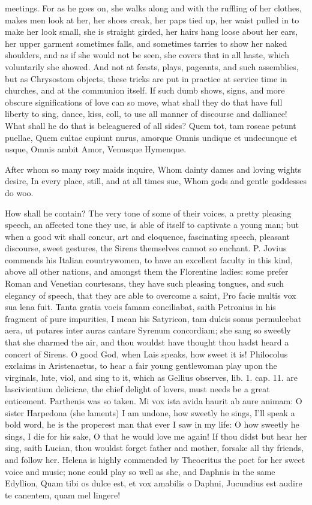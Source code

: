 {meetings. For as he goes on, she walks along and with the
ruffling of her clothes, makes men look at her, her shoes creak, her
paps tied up, her waist pulled in to make her look small, she is
straight girded, her hairs hang loose about her ears, her upper garment
sometimes falls, and sometimes tarries to show her naked shoulders, and
as if she would not be seen, she covers that in all haste, which
voluntarily she showed. And not at feasts, plays, pageants, and such
assemblies, but as Chrysostom objects, these tricks are put in
practice at service time in churches, and at the communion itself. If
such dumb shows, signs, and more obscure significations of love can so
move, what shall they do that have full liberty to sing, dance, kiss,
coll, to use all manner of discourse and dalliance! What shall he do
that is beleaguered of all sides?
Quem tot, tam roseae petunt puellae,
Quem cultae cupiunt nurus, amorque
Omnis undique et undecunque et usque,
Omnis ambit Amor, Venusque Hymenque.

After whom so many rosy maids inquire,
Whom dainty dames and loving wights desire,
In every place, still, and at all times sue,
Whom gods and gentle goddesses do woo.

How shall he contain? The very tone of some of their voices, a pretty
pleasing speech, an affected tone they use, is able of itself to
captivate a young man; but when a good wit shall concur, art and
eloquence, fascinating speech, pleasant discourse, sweet gestures, the
Sirens themselves cannot so enchant. P. Jovius commends his
Italian countrywomen, to have an excellent faculty in this kind, above
all other nations, and amongst them the Florentine ladies: some prefer
Roman and Venetian courtesans, they have such pleasing tongues, and
such  elegancy of speech, that they are able to overcome a saint,
Pro facie multis vox sua lena fuit. Tanta gratia vocis famam
conciliabat, saith Petronius in his fragment of pure impurities,
I mean his Satyricon, tam dulcis sonus permulcebat aera, ut putares
inter auras cantare Syrenum concordiam; she sang so sweetly that she
charmed the air, and thou wouldst have thought thou hadst heard a
concert of Sirens. O good God, when Lais speaks, how sweet it is!
Philocolus exclaims in Aristenaetus, to hear a fair young gentlewoman
play upon the virginals, lute, viol, and sing to it, which as Gellius
observes, lib. 1. cap. 11. are lascivientium delicicae, the chief
delight of lovers, must needs be a great enticement. Parthenis was so
taken. Mi vox ista avida haurit ab aure animam: O sister
Harpedona (she laments) I am undone, how sweetly he sings, I'll
speak a bold word, he is the properest man that ever I saw in my life:
O how sweetly he sings, I die for his sake, O that he would love me
again! If thou didst but hear her sing, saith Lucian, thou
wouldst forget father and mother, forsake all thy friends, and follow
her. Helena is highly commended by Theocritus the poet for her
sweet voice and music; none could play so well as she, and Daphnis in
the same Edyllion,
Quam tibi os dulce est, et vox amabilis o Daphni,
Jucundius est audire te canentem, quam mel lingere!

}
